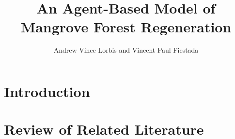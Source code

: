\documentclass[12]{report}
\title{An Agent-Based Model of Mangrove Forest Regeneration}
\author{Andrew Vince Lorbis and Vincent Paul Fiestada}
\begin{document}
\maketitle

\begin{abstract}
	
\end{abstract}

\chapter{Introduction}




\chapter{Review of Related Literature}
	
\end{document}
